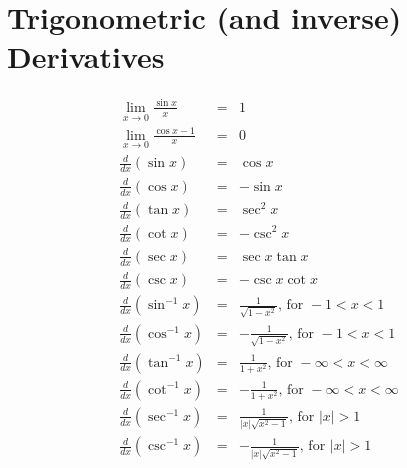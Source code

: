 \documentclass{article}
\begin{document}
\section*{Trigonometric (and inverse) Derivatives}
\begin{eqnarray}
    \lim_{x \to 0}{\frac{\sin{x}}{x}} &=& 1 \\
    \lim_{x \to 0}{\frac{\cos{x} - 1}{x}} &=& 0 \\
    \frac{d}{dx}\left(\sin{x}\right) &=& \cos{x} \\
    \frac{d}{dx}\left(\cos{x}\right) &=& - \sin{x} \\
    \frac{d}{dx}\left(\tan{x}\right) &=& \sec^2{x} \\
    \frac{d}{dx}\left(\cot{x}\right) &=& - \csc^2{x} \\
    \frac{d}{dx}\left(\sec{x}\right) &=& \sec{x}\tan{x} \\
    \frac{d}{dx}\left(\csc{x}\right) &=& - \csc{x}\cot{x} \\
    \frac{d}{dx}\left(\sin^{-1}{x}\right) &=& \frac{1}{\sqrt{1 - x^2}} \text{, for } -1 < x < 1 \\
    \frac{d}{dx}\left(\cos^{-1}{x}\right) &=& -\frac{1}{\sqrt{1 - x^2}} \text{, for } -1 < x < 1 \\
    \frac{d}{dx}\left(\tan^{-1}{x}\right) &=& \frac{1}{1 + x^2} \text{, for } -\infty < x < \infty \\
    \frac{d}{dx}\left(\cot^{-1}{x}\right) &=& -\frac{1}{1 + x^2} \text{, for } -\infty < x < \infty \\
    \frac{d}{dx}\left(\sec^{-1}{x}\right) &=& \frac{1}{|x|\sqrt{x^2 - 1}} \text{, for } |x| > 1 \\
    \frac{d}{dx}\left(\csc^{-1}{x}\right) &=& -\frac{1}{|x|\sqrt{x^2 - 1}} \text{, for } |x| > 1 \\
\end{eqnarray}
\end{document}
